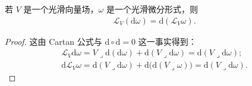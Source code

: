 \documentclass[../../main.tex]{subfiles}
\begin{document}
\begin{corollary}\label{corollary:ch14-lie-commutes-d}
若 $V$ 是一个光滑向量场，$\omega$ 是一个光滑微分形式，则
\begin{align*}
\mathcal L_V(\mathrm{d}\omega)=\mathrm{d}(\mathcal L_V\omega).
\end{align*}
\end{corollary}

\begin{proof}
这由 Cartan 公式与 $\mathrm{d}\circ\mathrm{d}=0$ 这一事实得到：
\begin{align*}
\mathcal L_V\mathrm{d}\omega=V\lrcorner\mathrm{d}(\mathrm{d}\omega)+\mathrm{d}(V\lrcorner\mathrm{d}\omega)=\mathrm{d}(V\lrcorner\mathrm{d}\omega);\\
\mathrm{d}\mathcal L_V\omega=\mathrm{d}(V\lrcorner\mathrm{d}\omega)+\mathrm{d}\bigl(\mathrm{d}(V\lrcorner\omega)\bigr)=\mathrm{d}(V\lrcorner\mathrm{d}\omega).
\end{align*}
\end{proof}
\end{document}

